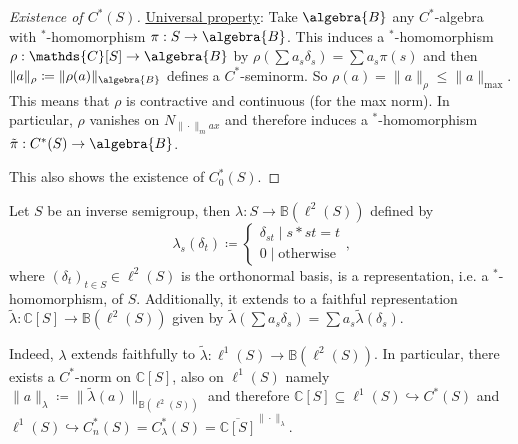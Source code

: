 \documentclass[a4paper]{article}
\begin{document}
\begin{proof}[Existence of $C^*(S)$]
	\underline{Universal property}: Take $\algebra{B}$ any $C^*$-algebra with $^*$-homomorphism $\pi: S \to \algebra{B}$.
	This induces a $^*$-homomorphism $\rho: \mathds{C}[S] \to \algebra{B}$ by $\rho(\sum a_s \delta_s) = \sum a_s \pi(s)$ and then $\|a\|_\rho \coloneq \|\rho(a)\|_\algebra{B}$ defines a $C^*$-seminorm.
	So $\rho(a) = \|a\|_\rho \leq \|a\|_{\max}$.
	This means that $\rho$ is contractive and continuous (for the max norm).
	In particular, $\rho$ vanishes on $N_{\|\cdot\|_max}$ and therefore induces a $^*$-homomorphism $\tilde{\pi}: C^*(S) \to \algebra{B}$.

	This also shows the existence of $C_0^*(S)$.	
\end{proof}

\begin{theorem}
	Let $S$ be an inverse semigroup, then $\lambda: S \to \mathds{B}(\ell^2(S))$ defined by
	\begin{equation*}
		\lambda_s(\delta_t) \coloneq \left\{ \begin{matrix}
			\delta_{st} \mid s* st = t \\
			0 \mid \text{otherwise}
		\end{matrix} \right.\text{,}
	\end{equation*}
	where $(\delta_t)_{t \in S} \in \ell^2(S)$ is the orthonormal basis, is a representation, i.e. a $^*$-homomorphism, of $S$.
	Additionally, it extends to a faithful representation $\tilde{\lambda}: \mathds{C}[S] \to \mathds{B}(\ell^2(S))$ given by $\tilde{\lambda}(\sum a_s \delta_s) = \sum a_s \tilde{\lambda}(\delta_s)$.
	
	Indeed, $\lambda$ extends faithfully to $\tilde{\lambda}: \ell^1(S) \to \mathds{B}(\ell^2(S))$.
	In particular, there exists a $C^*$-norm on $ \mathds{C}[S]$, also on $\ell^1(S)$ namely $\|a\|_\lambda \coloneq \| \tilde{\lambda}(a)\|_{\mathds{B}(\ell^2(S))}$ and therefore $\mathds{C}[S] \subseteq \ell^1(S) \hookrightarrow C^*(S)$ and $\ell^1(S) \hookrightarrow C_n^*(S) = C_\lambda^*(S) = \overline{\mathds{C}[S]}^{\|\cdot\|_\lambda}$.
\end{theorem}
\end{document}
